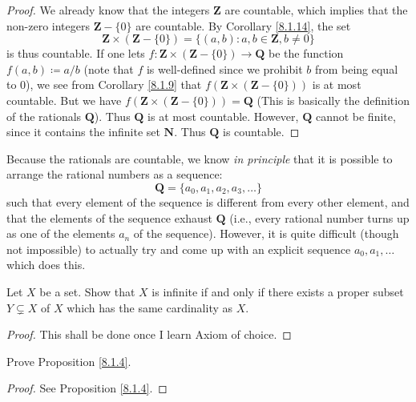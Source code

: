 \begin{proof}
We already know that the integers \(\mathbf{Z}\) are countable, which implies that the non-zero integers \(\mathbf{Z} - \{0\}\) are countable.
By Corollary \ref{8.1.14}, the set
\[
    \mathbf{Z} \times (\mathbf{Z} - \{0\}) = \{(a, b) : a, b \in \mathbf{Z}, b \neq 0\}
\]
is thus countable.
If one lets \(f : \mathbf{Z} \times (\mathbf{Z} - \{0\}) \to \mathbf{Q}\) be the function \(f(a, b) \coloneqq a / b\)
(note that \(f\) is well-defined since we prohibit \(b\) from being equal to \(0\)), we see from Corollary \ref{8.1.9} that \(f(\mathbf{Z} \times (\mathbf{Z} - \{0\}))\) is at most countable.
But we have \(f(\mathbf{Z} \times (\mathbf{Z} - \{0\})) = \mathbf{Q}\)
(This is basically the definition of the rationals \(\mathbf{Q}\)).
Thus \(\mathbf{Q}\) is at most countable.
However, \(\mathbf{Q}\) cannot be finite, since it contains the infinite set \(\mathbf{N}\).
Thus \(\mathbf{Q}\) is countable.
\end{proof}

\begin{remark}\label{8.1.16}
Because the rationals are countable, we know \emph{in principle} that it is possible to arrange the rational numbers as a sequence:
\[
    \mathbf{Q} = \{a_0, a_1, a_2, a_3, \dots\}
\]
such that every element of the sequence is different from every other element, and that the elements of the sequence exhaust \(\mathbf{Q}\)
(i.e., every rational number turns up as one of the elements \(a_n\) of the sequence).
However, it is quite difficult (though not impossible) to actually try and come up with an explicit sequence \(a_0, a_1, \dots\) which does this.
\end{remark}

\exercisesection

\begin{exercise}\label{ex 8.1.1}
Let \(X\) be a set.
Show that \(X\) is infinite if and only if there exists a proper subset \(Y \subsetneq X\) of \(X\) which has the same cardinality as \(X\).
\end{exercise}

\begin{proof}
This shall be done once I learn Axiom of choice.
\end{proof}

\begin{exercise}\label{ex 8.1.2}
Prove Proposition \ref{8.1.4}.
\end{exercise}

\begin{proof}
See Proposition \ref{8.1.4}.
\end{proof}

